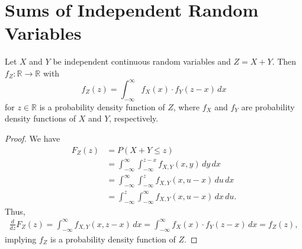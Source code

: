 \section{Sums of Independent Random Variables}
\begin{theorem}
  Let $X$ and $Y$ be independent continuous random variables and $Z = X + Y$.
  Then $f_Z: \mathbb{R} \to \mathbb{R}$ with
  \begin{equation*}
    f_Z(z) = \int_{-\infty}^\infty f_X(x) \cdot f_Y(z-x)\,dx
  \end{equation*}
  for $z \in \mathbb{R}$ is a probability density function of $Z$, where $f_X$
  and $f_Y$ are probability density functions of $X$ and $Y$, respectively.
\end{theorem}
\begin{proof}
  We have
  \begin{align*}
    F_Z(z)
    &= P(X + Y \leq z) \\
    &= \int_{-\infty}^\infty \int_{-\infty}^{z-x} f_{X,Y}(x, y)\,dy\,dx \\
    &= \int_{-\infty}^\infty \int_{-\infty}^z f_{X,Y}(x, u-x)\,du\,dx
       \tag{$u = x + y$} \\
    &= \int_{-\infty}^z \int_{-\infty}^\infty f_{X,Y}(x, u-x)\,dx\,du.
  \end{align*}
  Thus,
  \begin{align*}
    \frac{d}{dz}F_Z(z)
    = \int_{-\infty}^\infty f_{X,Y}(x, z-x)\,dx
    = \int_{-\infty}^\infty f_X(x) \cdot f_Y(z-x)\,dx
    = f_Z(z),
  \end{align*}
  implying $f_Z$ is a probability density function of $Z$.
\end{proof}